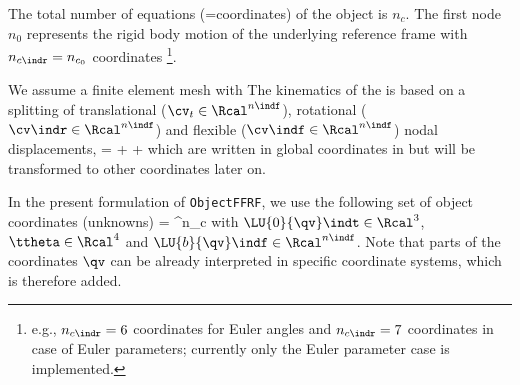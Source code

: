     \noindent The total number of equations (=coordinates) of the object is $n_c$.
    The first node $n_0$ represents the rigid body motion of the underlying reference frame with $n_{c\indr} = n_{c_0}$ coordinates \footnote{e.g., 
    $n_{c\indr}=6$ coordinates for Euler angles and $n_{c\indr}=7$ coordinates in case of Euler parameters; currently only the Euler parameter
    case is implemented.}. 
    
    We assume a finite element mesh with 
    The kinematics of the  is based on a splitting of 
    translational ($\cv_t \in \Rcal^{n\indf}$), rotational ($\cv\indr \in \Rcal^{n\indf}$) and flexible ($\cv\indf \in \Rcal^{n\indf}$) nodal displacements, 
    \be \label{eq:ObjectFFRF:coordinatesSplitting}
       =  +  +  \eqDot
    \ee
    which are written in global coordinates in  but will be transformed to other coordinates later on.
    
    In the present formulation of \texttt{ObjectFFRF}, we use the following set of object coordinates (unknowns)
    \be
      \qv = \tp \in \Rcal^{n_c}
    \ee
    with $\LU{0}{\qv}\indt \in \Rcal^{3}$, $\ttheta \in \Rcal^{4}$ and $\LU{b}{\qv}\indf \in \Rcal^{n\indf}$.
    Note that parts of the coordinates $\qv$ can be already interpreted in specific coordinate systems, which is therefore added.
    
